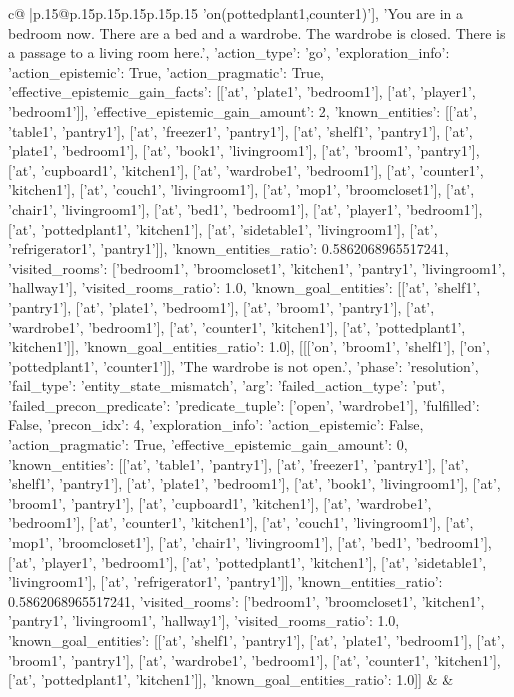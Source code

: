 \documentclass{article}
\begin{document}
{\begin{supertabular}{c@{$\;$}|p{.15\linewidth}@{}p{.15\linewidth}p{.15\linewidth}p{.15\linewidth}p{.15\linewidth}p{.15\linewidth}}
{{{'on(pottedplant1,counter1)'], 'You are in a bedroom now. There are a bed and a wardrobe. The wardrobe is closed. There is a passage to a living room here.', {'action_type': 'go', 'exploration_info': {'action_epistemic': True, 'action_pragmatic': True, 'effective_epistemic_gain_facts': [['at', 'plate1', 'bedroom1'], ['at', 'player1', 'bedroom1']], 'effective_epistemic_gain_amount': 2, 'known_entities': [['at', 'table1', 'pantry1'], ['at', 'freezer1', 'pantry1'], ['at', 'shelf1', 'pantry1'], ['at', 'plate1', 'bedroom1'], ['at', 'book1', 'livingroom1'], ['at', 'broom1', 'pantry1'], ['at', 'cupboard1', 'kitchen1'], ['at', 'wardrobe1', 'bedroom1'], ['at', 'counter1', 'kitchen1'], ['at', 'couch1', 'livingroom1'], ['at', 'mop1', 'broomcloset1'], ['at', 'chair1', 'livingroom1'], ['at', 'bed1', 'bedroom1'], ['at', 'player1', 'bedroom1'], ['at', 'pottedplant1', 'kitchen1'], ['at', 'sidetable1', 'livingroom1'], ['at', 'refrigerator1', 'pantry1']], 'known_entities_ratio': 0.5862068965517241, 'visited_rooms': ['bedroom1', 'broomcloset1', 'kitchen1', 'pantry1', 'livingroom1', 'hallway1'], 'visited_rooms_ratio': 1.0, 'known_goal_entities': [['at', 'shelf1', 'pantry1'], ['at', 'plate1', 'bedroom1'], ['at', 'broom1', 'pantry1'], ['at', 'wardrobe1', 'bedroom1'], ['at', 'counter1', 'kitchen1'], ['at', 'pottedplant1', 'kitchen1']], 'known_goal_entities_ratio': 1.0}}], [[['on', 'broom1', 'shelf1'], ['on', 'pottedplant1', 'counter1']], 'The wardrobe is not open.', {'phase': 'resolution', 'fail_type': 'entity_state_mismatch', 'arg': {'failed_action_type': 'put', 'failed_precon_predicate': {'predicate_tuple': ['open', 'wardrobe1'], 'fulfilled': False, 'precon_idx': 4}}, 'exploration_info': {'action_epistemic': False, 'action_pragmatic': True, 'effective_epistemic_gain_amount': 0, 'known_entities': [['at', 'table1', 'pantry1'], ['at', 'freezer1', 'pantry1'], ['at', 'shelf1', 'pantry1'], ['at', 'plate1', 'bedroom1'], ['at', 'book1', 'livingroom1'], ['at', 'broom1', 'pantry1'], ['at', 'cupboard1', 'kitchen1'], ['at', 'wardrobe1', 'bedroom1'], ['at', 'counter1', 'kitchen1'], ['at', 'couch1', 'livingroom1'], ['at', 'mop1', 'broomcloset1'], ['at', 'chair1', 'livingroom1'], ['at', 'bed1', 'bedroom1'], ['at', 'player1', 'bedroom1'], ['at', 'pottedplant1', 'kitchen1'], ['at', 'sidetable1', 'livingroom1'], ['at', 'refrigerator1', 'pantry1']], 'known_entities_ratio': 0.5862068965517241, 'visited_rooms': ['bedroom1', 'broomcloset1', 'kitchen1', 'pantry1', 'livingroom1', 'hallway1'], 'visited_rooms_ratio': 1.0, 'known_goal_entities': [['at', 'shelf1', 'pantry1'], ['at', 'plate1', 'bedroom1'], ['at', 'broom1', 'pantry1'], ['at', 'wardrobe1', 'bedroom1'], ['at', 'counter1', 'kitchen1'], ['at', 'pottedplant1', 'kitchen1']], 'known_goal_entities_ratio': 1.0}}]] 
	  } 
	   } 
	   } 
	 & & \\ 
 


\end{supertabular}}
\end{document}
